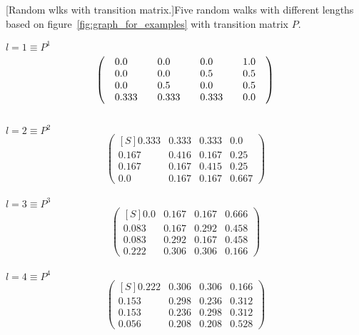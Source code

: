 
\centering
\normalsize
{}[Random wlks with transition matrix.]{Five random walks with different lengths based on figure~\ref{fig:graph_for_examples} with transition matrix $P$.}\label{tbl:RW2}
\begin{multicols}{2}
\centering
$l = 1 \equiv P^1$
\vspace{-.5em}
\[
\begin{pmatrix*}[S]
0.0	& 0.0	& 0.0	& 1.0\\
0.0	& 0.0	& 0.5	& 0.5\\
0.0	& 0.5	& 0.0	&0.5\\
0.333	& 0.333	& 0.333	&0.0\text{\phantom{$00$}}
\end{pmatrix*}
\]\\

$l = 2 \equiv P^2$
\vspace{-.5em}
\[
\begin{pmatrix*}[S]
0.333	& 0.333	& 0.333	& 0.0\\
0.167	& 0.416	& 0.167	& 0.25\\
0.167	& 0.167	& 0.415	& 0.25\\
0.0	& 0.167	& 0.167	& 0.667
\end{pmatrix*}
\]\\

$l = 3 \equiv P^3$
\vspace{-.5em}
\[
\begin{pmatrix*}[S]
0.0	    & 0.167	& 0.167	& 0.666\\
0.083	& 0.167	& 0.292	& 0.458\\
0.083	& 0.292	& 0.167	& 0.458\\
0.222	& 0.306	& 0.306	& 0.166
\end{pmatrix*}
\]\\

$l = 4 \equiv P^4$
\vspace{-.5em}
\[
\begin{pmatrix*}[S]
0.222	& 0.306	& 0.306	& 0.166\\
0.153	& 0.298	& 0.236	& 0.312\\
0.153	& 0.236	& 0.298	& 0.312\\
0.056	& 0.208	& 0.208	& 0.528
\end{pmatrix*}
\]\\


\end{multicols}
